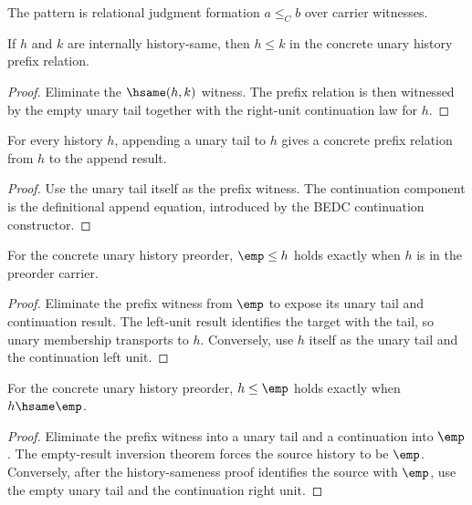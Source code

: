 \begin{definition}
\label{def:preorder-pattern-specification}
The pattern is relational judgment formation \(a\le_C b\) over carrier witnesses.
\end{definition}

\begin{theorem}
\label{thm:preorder-prefix-le-of-hsame}
If $h$ and $k$ are internally history-same, then $h\le k$ in the concrete unary
history prefix relation.
\end{theorem}
\begin{proof}
Eliminate the $\hsame(h,k)$ witness. The prefix relation is then witnessed by
the empty unary tail together with the right-unit continuation law for $h$.
\end{proof}

\begin{theorem}
\label{thm:preorder-prefix-append-unary-tail}
For every history \(h\), appending a unary tail to \(h\) gives a concrete
prefix relation from \(h\) to the append result.
\end{theorem}
\begin{proof}
Use the unary tail itself as the prefix witness. The continuation component is
the definitional append equation, introduced by the BEDC continuation
constructor.
\end{proof}

\begin{theorem}
\label{thm:preorder-prefix-empty-left-iff-unary}
For the concrete unary history preorder, $\emp\le h$ holds exactly when $h$ is in the preorder carrier.
\end{theorem}
\begin{proof}
Eliminate the prefix witness from $\emp$ to expose its unary tail and continuation result. The left-unit result identifies the target with the tail, so unary membership transports to $h$. Conversely, use $h$ itself as the unary tail and the continuation left unit.
\end{proof}

\begin{theorem}
\label{thm:preorder-prefix-empty-target-iff}
For the concrete unary history preorder, $h\le \emp$ holds exactly when
$h\hsame \emp$.
\end{theorem}
\begin{proof}
Eliminate the prefix witness into a unary tail and a continuation into
$\emp$. The empty-result inversion theorem forces the source history to be
$\emp$. Conversely, after the history-sameness proof identifies the source
with $\emp$, use the empty unary tail and the continuation right unit.
\end{proof}

